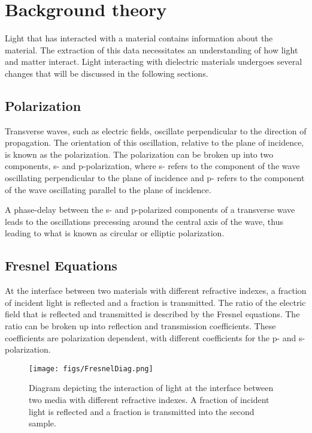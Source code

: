 \chapter{Background theory}
\label{chp:Theory}

Light that has interacted with a material contains information about the material. The extraction of this data necessitates an understanding of how light and matter interact. Light interacting with dielectric materials undergoes several changes that will be discussed in the following sections.

\section{Polarization}
\label{sec:Pol}

Transverse waves, such as electric fields, oscillate perpendicular to the direction of propagation. The orientation of this oscillation, relative to the plane of incidence, is known as the polarization. The polarization can be broken up into two components, s- and p-polarization, where s- refers to the component of the wave oscillating perpendicular to the plane of incidence and p- refers to the component of the wave oscillating parallel to the plane of incidence.

A phase-delay between the s- and p-polarized components of a transverse wave leads to the oscillations precessing around the central axis of the wave, thus leading to what is known as circular or elliptic polarization.

\section{Fresnel Equations}
\label{sec:Fresnel}

At the interface between two materials with different refractive indexes, a fraction of incident light is reflected and a fraction is transmitted. The ratio of the electric field that is reflected and transmitted is described by the Fresnel equations. The ratio can be broken up into reflection and transmission coefficients. These coefficients are polarization dependent, with different coefficients for the p- and s-polarization.\cite{Driscoll-1978}
\begin{figure}[H]
\begin{center}
	 \texttt{[image: figs/FresnelDiag.png]}
	 \caption{Diagram depicting the interaction of light at the interface between two media with different refractive indexes. A fraction of incident light is reflected and a fraction is transmitted into the second sample.}
   \label{fig:FresRef}
\end{center}
\end{figure}


